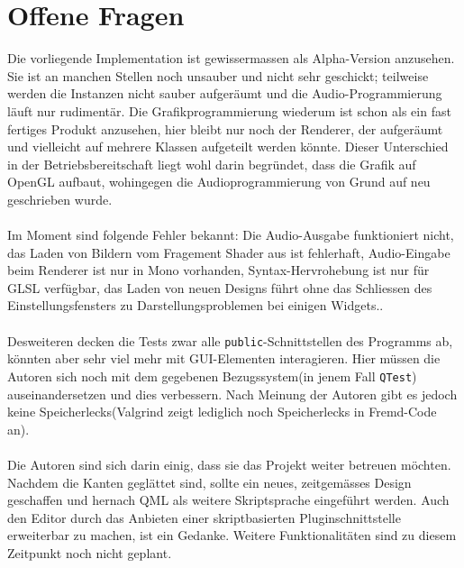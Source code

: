 \newpage

\section{Offene Fragen} \label{sec:WhatsNext}
	Die vorliegende Implementation ist gewissermassen als Alpha-Version anzusehen. Sie ist an manchen Stellen noch unsauber und nicht sehr geschickt; teilweise werden
    die Instanzen nicht sauber aufgeräumt und die Audio-Programmierung läuft nur rudimentär. Die Grafikprogrammierung wiederum ist schon als ein fast fertiges Produkt anzusehen,
    hier bleibt nur noch der Renderer, der aufgeräumt und vielleicht auf mehrere Klassen aufgeteilt werden könnte. Dieser Unterschied in der Betriebsbereitschaft liegt
    wohl darin begründet, dass die Grafik auf OpenGL aufbaut, wohingegen die Audioprogrammierung von Grund auf neu geschrieben wurde.
\paragraph{}
    Im Moment sind folgende Fehler bekannt: Die Audio-Ausgabe funktioniert nicht, das Laden von Bildern vom Fragement Shader aus ist fehlerhaft, Audio-Eingabe beim Renderer
    ist nur in Mono vorhanden, Syntax-Hervrohebung ist nur für GLSL verfügbar, das Laden von neuen Designs führt ohne das Schliessen des Einstellungsfensters zu Darstellungsproblemen
    bei einigen Widgets..
\paragraph{}
    Desweiteren decken die Tests zwar alle \texttt{public}-Schnittstellen des Programms ab, könnten aber sehr viel mehr mit GUI-Elementen interagieren. Hier müssen
    die Autoren sich noch mit dem gegebenen Bezugssystem(in jenem Fall \texttt{QTest}) auseinandersetzen und dies verbessern. Nach Meinung der Autoren gibt es jedoch
    keine Speicherlecks(Valgrind zeigt lediglich noch Speicherlecks in Fremd-Code an).
\paragraph{}
    Die Autoren sind sich darin einig, dass sie das Projekt weiter betreuen möcht\-en. Nachdem die Kanten geglättet sind, sollte ein neues, zeitgemässes Design geschaffen
    und hernach QML als weitere Skriptsprache eingeführt werden. Auch den Editor durch das Anbieten einer skriptbasierten Pluginschnittstelle erweiterbar zu machen, ist
    ein Gedanke. Weitere Funktionalitäten sind zu diesem Zeitpunkt noch nicht geplant.

